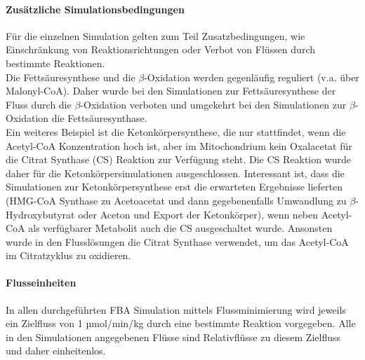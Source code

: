 \paragraph{Zusätzliche Simulationsbedingungen}
Für die einzelnen Simulation gelten zum Teil Zusatzbedingungen, wie Einschränkung von Reaktionsrichtungen oder Verbot von Flüssen durch bestimmte Reaktionen.\\
Die Fettsäuresynthese und die $\beta$-Oxidation werden gegenläufig reguliert (v.a. über Malonyl-CoA). Daher wurde bei den Simulationen zur Fettsäuresynthese der Fluss durch die $\beta$-Oxidation verboten und umgekehrt bei den Simulationen zur $\beta$-Oxidation die Fettsäuresynthase.\\
Ein weiteres Beispiel ist die Ketonkörpersynthese, die nur stattfindet, wenn die Acetyl-CoA Konzentration hoch ist, aber im Mitochondrium kein Oxalacetat für die Citrat Synthase (CS) Reaktion zur Verfügung steht. Die CS Reaktion wurde daher für die Ketonkörpersimulationen ausgeschlossen. Interessant ist, dass die Simulationen zur Ketonkörpersynthese erst die erwarteten Ergebnisse lieferten (HMG-CoA Synthase zu Acetoacetat und dann gegebenenfalls Umwandlung zu $\beta$-Hydroxybutyrat oder Aceton und Export der Ketonkörper), wenn neben Acetyl-CoA als verfügbarer Metabolit auch die CS ausgeschaltet wurde. Ansonsten wurde in den Flusslösungen die Citrat Synthase verwendet, um das Acetyl-CoA im Citratzyklus zu oxidieren.

\paragraph{Flusseinheiten}
\label{flux_units}
In allen durchgeführten FBA Simulation mittels Flussminimierung wird jeweils ein Zielfluss von 1 µmol/min/kg durch eine bestimmte Reaktion vorgegeben. Alle in den Simulationen angegebenen Flüsse sind Relativflüsse zu diesem Zielfluss und daher einheitenlos. 